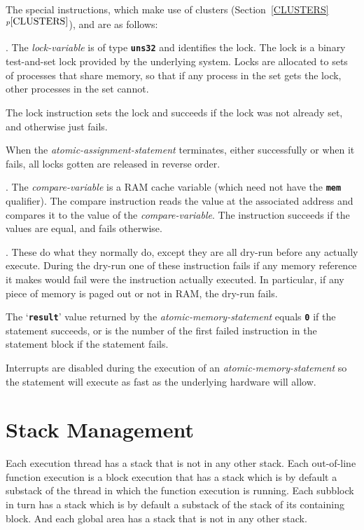\documentclass[12pt]{article}
\newcommand{\TT}[1]{{\tt \bfseries #1}}
\newcommand{\itemref}[1]{\ref{#1}$^{p\pageref{#1}}$}
\newenvironment{indpar}[1][0.3in]%
	{\begin{list}{}%
		     {\setlength{\itemsep}{0in}%
		      \setlength{\topsep}{0in}%
		      \setlength{\parsep}{1ex}%
		      \setlength{\labelwidth}{#1}%
		      \setlength{\leftmargin}{#1}%
		      \addtolength{\leftmargin}{\labelsep}}%
	 \item}%
	{\end{list}}
\begin{document}
The special instructions,
which make use of clusters (Section~\itemref{CLUSTERS}),
and are as follows:
\begin{indpar}[0.4in]
\hspace*{-0.2in}{\em \bf Lock-Instruction}.
The {\em lock-variable} is of type \TT{uns32}
and identifies the lock.
The lock is a binary test-and-set lock provided by the
underlying system.  Locks are allocated to sets of processes
that share memory, so that if any process in the set gets
the lock, other processes in the set cannot.

The lock instruction sets the lock and succeeds if the lock
was not already set, and otherwise just fails.

When the {\em atomic-assignment-statement} terminates, either
successfully or when it fails, all locks gotten are released in
reverse order.

\hspace*{-0.2in}{\em \bf Compare-Instruction}.
The {\em compare-variable} is a RAM cache variable (which need
not have the \TT{mem} qualifier).  The compare
instruction reads the value at the associated address and compares
it to the value of the {\em compare-variable}.  The instruction
succeeds if the values are equal, and fails otherwise.


\hspace*{-0.2in}{\em \bf Write-Instructions}.
These do what they normally do, except they are all dry-run 
before any actually execute.  During the dry-run one of these
instruction fails if any memory reference it makes would fail
were the instruction actually executed.  In particular, if any
piece of memory is paged out or not in RAM, the dry-run fails.
\end{indpar}

The `\TT{result}' value returned by the {\em atomic-memory-statement}
equals \TT{0} if the statement succeeds, or is the number of the
first failed instruction in the statement block if the statement
fails.

Interrupts are disabled during the execution of an
{\em atomic-memory-statement} so the statement will execute as
fast as the underlying hardware will allow.

\section{Stack Management}
\label{STACK-MANAGEMENT}

Each execution thread has a stack that is not in any other
stack.  Each out-of-line function
execution is a block execution that has a stack which is
by default a substack of the thread in which the function
execution is running.  Each subblock in turn has a stack
which is by default a substack of the stack of its containing block.
And each global area has a stack that is not in any other stack.
\end{document}
